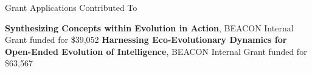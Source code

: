 \begin{rubric}{Grant Applications Contributed To}

\entry*[2018] \textbf{Synthesizing Concepts within Evolution in Action}, BEACON Internal Grant funded for \$39,052 
%
\entry*[2017] \textbf{Harnessing Eco-Evolutionary Dynamics for Open-Ended Evolution of Intelligence}, BEACON Internal Grant funded for \$63,567 
%
\end{rubric}